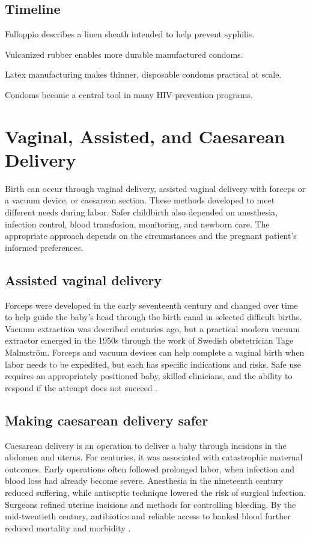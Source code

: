 \documentclass[12pt,oneside]{book}
\begin{document}
\section*{Timeline}
\begin{description}[leftmargin=2.3cm,style=nextline]
  \item[Sixteenth century] Falloppio describes a linen sheath intended to help prevent syphilis.
  \item[1840s--1850s] Vulcanized rubber enables more durable manufactured condoms.
  \item[1930s] Latex manufacturing makes thinner, disposable condoms practical at scale.
  \item[1980s onward] Condoms become a central tool in many HIV-prevention programs.
\end{description}
\chapter[Vaginal, Assisted, and Caesarean Delivery]{Vaginal, Assisted, and Caesarean Delivery}

Birth can occur through vaginal delivery, assisted vaginal delivery with
forceps or a vacuum device, or caesarean section. These methods developed to
meet different needs during labor. Safer childbirth also depended on
anesthesia, infection control, blood transfusion, monitoring, and newborn
care. The appropriate approach depends on the circumstances and the pregnant
patient's informed preferences.

\section{Assisted vaginal delivery}
Forceps were developed in the early seventeenth century and changed over time
to help guide the baby's head through the birth canal in selected difficult
births. Vacuum extraction was described centuries ago, but a practical modern
vacuum extractor emerged in the 1950s through the work of Swedish obstetrician
Tage Malmstr\"om. Forceps and vacuum devices can help complete a vaginal birth
when labor needs to be expedited, but each has specific indications and risks.
Safe use requires an appropriately positioned baby, skilled clinicians, and
the ability to respond if the attempt does not succeed
\cite{baskettOperativeDelivery2019,acogAssistedVaginalDelivery}.

\section{Making caesarean delivery safer}
Caesarean delivery is an operation to deliver a baby through incisions in the
abdomen and uterus. For centuries, it was associated with catastrophic
maternal outcomes. Early operations often followed prolonged labor, when
infection and blood loss had already become severe. Anesthesia in the
nineteenth century reduced suffering, while antiseptic technique lowered the
risk of surgical infection. Surgeons refined uterine incisions and methods for
controlling bleeding. By the mid-twentieth century, antibiotics and reliable
access to banked blood further reduced mortality and morbidity
\cite{caesareanHistory,nlmCaesareanHistory}.
\end{document}
